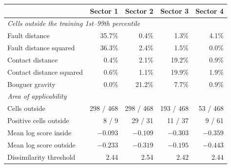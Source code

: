 \begin{tabular}{lrrrr}
\toprule
 & Sector 1 & Sector 2 & Sector 3 & Sector 4 \\
\midrule
\multicolumn{5}{l}{\emph{Cells outside the training 1st--99th percentile}} \\
\quad Fault distance & 35.7\% & 0.4\% & 1.3\% & 4.1\% \\
\quad Fault distance squared & 36.3\% & 2.4\% & 1.5\% & 0.0\% \\
\quad Contact distance & 0.4\% & 2.1\% & 19.2\% & 0.9\% \\
\quad Contact distance squared & 0.6\% & 1.1\% & 19.9\% & 1.9\% \\
\quad Bouguer gravity & 0.0\% & 21.2\% & 7.7\% & 0.9\% \\
\multicolumn{5}{l}{\emph{Area of applicability}} \\
\quad Cells outside & 298 / 468 & 298 / 468 & 193 / 468 & 53 / 468 \\
\quad Positive cells outside & 8 / 9 & 29 / 31 & 11 / 37 & 9 / 61 \\
\quad Mean log score inside & $-0.093$ & $-0.109$ & $-0.303$ & $-0.359$ \\
\quad Mean log score outside & $-0.233$ & $-0.319$ & $-0.195$ & $-0.443$ \\
\quad Dissimilarity threshold & 2.44 & 2.54 & 2.42 & 2.44 \\
\bottomrule
\end{tabular}

